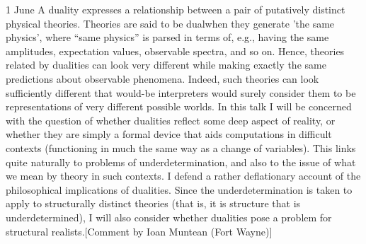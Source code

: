 \documentclass{conference}
\begin{document}
\begin{Day}{1 June}
{A duality expresses a relationship between a pair of putatively distinct physical theories. Theories are said to be dualwhen they generate 'the same physics', where “same physics” is parsed in terms of, e.g., having the same amplitudes, expectation values, observable spectra, and so on. Hence, theories related by dualities can look very different while making exactly the same predictions about observable phenomena. Indeed, such theories can look sufficiently different that would-be interpreters would surely consider them to be representations of very different possible worlds. In this talk I will be concerned with the question of whether dualities reflect some deep aspect of reality, or whether they are simply a formal device that aids computations in difficult contexts (functioning in much the same way as a change of variables).  This links quite naturally to problems of underdetermination, and also to the issue of what we mean by theory in such contexts. I defend a rather deflationary account of the philosophical implications of dualities. Since the underdetermination is taken to apply to structurally distinct theories (that is, it is structure that is underdetermined), I will also consider whether dualities pose a problem for structural realists.}[Comment by Ioan Muntean (Fort Wayne)]
\end{Day}


\pagebreak
\ListAbstracts
\end{document}
